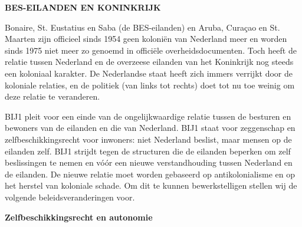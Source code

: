 \textbf{BES-EILANDEN EN KONINKRIJK}

Bonaire, St. Eustatius en Saba (de BES-eilanden) en Aruba, Curaçao en
St. Maarten zijn officieel sinds 1954 geen koloniën van Nederland meer
en worden sinds 1975 niet meer zo genoemd in officiële
overheidsdocumenten. Toch heeft de relatie tussen Nederland en de
overzeese eilanden van het Koninkrijk nog steeds een koloniaal karakter.
De Nederlandse staat heeft zich immers verrijkt door de koloniale
relaties, en de politiek (van links tot rechts) doet tot nu toe weinig
om deze relatie te veranderen.

BIJ1 pleit voor een einde van de ongelijkwaardige relatie tussen de
besturen en bewoners van de eilanden en die van Nederland. BIJ1 staat
voor zeggenschap en zelfbeschikkingsrecht voor inwoners: niet Nederland
beslist, maar mensen op de eilanden zelf. BIJ1 strijdt tegen de
structuren die de eilanden beperken om zelf beslissingen te nemen en
vóór een nieuwe verstandhouding tussen Nederland en de eilanden. De
nieuwe relatie moet worden gebaseerd op antikolonialisme en op het
herstel van koloniale schade. Om dit te kunnen bewerkstelligen stellen
wij de volgende beleidsveranderingen voor.

\textbf{Zelfbeschikkingsrecht en autonomie}

